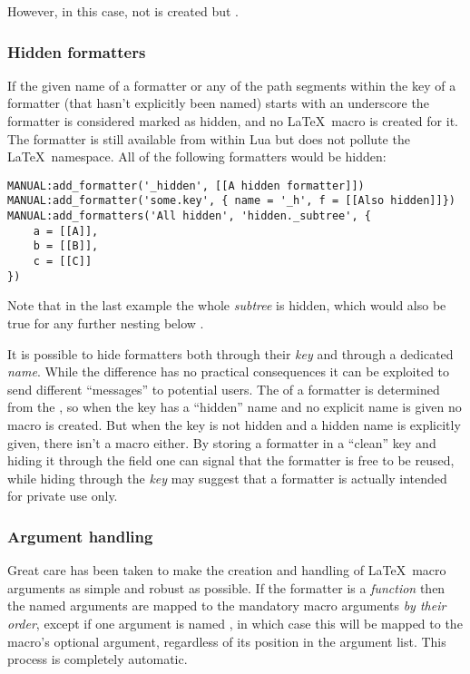 \documentclass[12pt]{scrartcl}
\begin{document}
\noindent However, in this case, not  is created but .


\subsubsection{Hidden formatters}
\label{sec:usage:hidden-formatters}

If the given name of a formatter or any of the path segments within the key
of a formatter (that hasn't explicitly been named) starts with an underscore the
formatter is considered marked as hidden, and no \LaTeX\ macro is created for
it.  The formatter is still available from within Lua but does not pollute the
\LaTeX\ namespace.  All of the following formatters would be hidden:

\begin{verbatim}
MANUAL:add_formatter('_hidden', [[A hidden formatter]])
MANUAL:add_formatter('some.key', { name = '_h', f = [[Also hidden]]})
MANUAL:add_formatters('All hidden', 'hidden._subtree', {
	a = [[A]],
	b = [[B]],
	c = [[C]]
})
\end{verbatim}

\noindent Note that in the last example the whole \emph{subtree} is hidden,
which would also be true for any further nesting below
.

It is possible to hide formatters both through their \emph{key} and through a
dedicated \emph{name}.  While the difference has no practical consequences it
can be exploited to send different “messages” to potential users.  The
 of a formatter is determined from the , so when the
key has a “hidden” name and no explicit name is given no macro is created. But
when the key is not hidden and a hidden name is explicitly given, there isn't a
macro either. By storing a formatter in a “clean” key and hiding it through the
 field one can signal that the formatter is free to be reused,
while hiding through the \emph{key} may suggest that a formatter is actually
intended for private use only.

\subsubsection{Argument handling}
\label{sec:usage-argument-handling}

Great care has been taken to make the creation and handling of \LaTeX\ macro
arguments as simple and robust as possible.  If the formatter is a
\emph{function} then the named arguments are mapped to the mandatory macro
arguments \emph{by their order}, except if one argument is named
, in which case this will be mapped to the macro's optional
argument, regardless of its position in the argument list. This process is
completely automatic.
\end{document}
